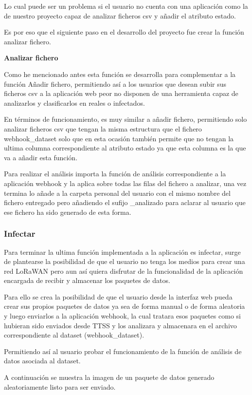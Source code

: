 Lo cual puede ser un problema si el usuario no cuenta con una aplicación como la de nuestro proyecto capaz de analizar ficheros csv y añadir el atributo estado.

Es por eso que el siguiente paso en el desarrollo del proyecto fue crear la función analizar fichero.


\textbf{Analizar fichero}

Como he mencionado antes esta función se desarrolla para complementar a la función Añadir fichero, permitiendo así a los usuarios que desean subir sus ficheros csv a la aplicación web peor no disponen de una herramienta capaz de analizarlos y clasificarlos en reales o infectados.

En términos de funcionamiento, es muy similar a añadir fichero, permitiendo solo analizar ficheros csv que tengan la misma estructura que el fichero webhook\_dataset solo que en esta ocasión también permite que no tengan la ultima columna correspondiente al atributo estado ya que esta columna es la que va a añadir esta función.

Para realizar el análisis importa la función de análisis correspondiente a la aplicación webhook y la aplica sobre todas las filas del fichero a analizar, una vez termina lo añade a la carpeta personal del usuario con el mismo nombre del fichero entregado pero añadiendo el sufijo \_analizado para aclarar al usuario que ese fichero ha sido generado de esta forma.


\subsubsection{Infectar}

Para terminar la ultima función implementada a la aplicación es infectar, surge de plantearse la posibilidad de que el usuario no tenga los medios para crear una red LoRaWAN pero aun así quiera disfrutar de la funcionalidad de la aplicación encargada de recibir y almacenar los paquetes de datos.

Para ello se crea la posibilidad de que el usuario desde la interfaz web pueda crear sus propios paquetes de datos ya sea de forma manual o de forma aleatoria y luego enviarlos a la aplicación webhook, la cual tratara esos paquetes como si hubieran sido enviados desde TTSS y los analizara y almacenara en el archivo correspondiente al dataset (webhook\_dataset).

Permitiendo así al usuario probar el funcionamiento de la función de análisis de datos asociada al dataset.

A continuación se muestra la imagen de un paquete de datos generado aleatoriamente listo para ser enviado.


